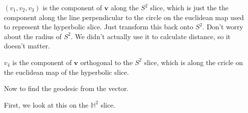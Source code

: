 \documentclass[12pt]{amsart}
\newcommand{\ignore}[1]{}
\begin{document}
$(v_1,v_2,v_3)$ is the component of $\textbf{v}$ along the $S^2$ slice, which is just the the component along the line perpendicular to the circle on the euclidean map used to represent the hyperbolic slice. Just transform this back onto $S^2$. Don't worry about the radius of $S^2$. We didn't actually use it to calculate distance, so it doesn't matter.

$v_4$ is the component of $\textbf{v}$ orthogonal to the $S^2$ slice, which is along the cricle on the euclidean map of the hyperbolic slice.

\ignore{
There is one more problem. There are multiple images of $\textbf{y}$ from $\textbf{x}$. They are all just multiples of $e^{2\pi k}$, but the problem is connecting them to the correct other images in a triangle. In order to do that, I need to standardize which is being referred to.

When finding the great circle on $S^2$, we need to find where it intersects with some imaginary line. For example, $z_2 = 0, z_1 \geq 0$.

The equation for the great circle is $\textbf{x}\cos\theta + \textbf{y}'\sin\theta$. Thus, we have to find $x_2\cos\theta + y'_2\sin\theta = 0$

$\frac{x_3}{y'_3} = \tan\theta$

$\theta = \arctan\frac{x_3}{y'_3}$

Only every other value for that is correct. We just have to test to see if the first attempt fulfills $x_1\cos\theta + y_1\sin\theta \geq 0$, and add $\pi$ if it does not.

Now we add or subtract $2\pi$ to make sure it's in the correct range.

We make sure to store an extra integer $n$ in $\textbf{y}$, representing how many extra loops around the circle it goes. Once we move it into the $\mathbb{H}^2$ slice, we just multiply it by $e^{nk}$ to make sure it's in the right place.

The purpose of this is that I need a covering map that shows how many loops around it went. In this case, I used the universal covering space of $S^2$ minus the poles. I essentially did it on a nonstandard topology of $S^2 \times \mathbb{Z}$.
}

\bigskip

Now to find the geodesic from the vector.

\bigskip

First, we look at this on the $\mathbb{H}^2$ slice.
\end{document}
